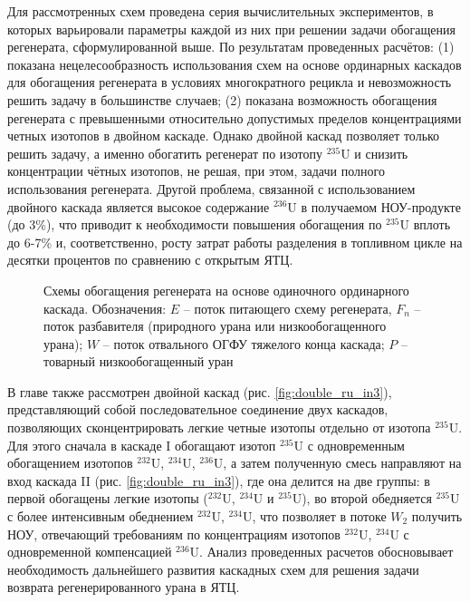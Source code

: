 Для рассмотренных схем проведена серия вычислительных экспериментов, в которых варьировали параметры каждой из них при решении задачи обогащения регенерата, сформулированной выше. По результатам проведенных расчётов: (1) показана нецелесообразность использования схем на основе ординарных каскадов для обогащения регенерата в условиях многократного рецикла и невозможность решить задачу в большинстве случаев; (2) показана возможность обогащения регенерата с превышенными относительно допустимых пределов концентрациями четных изотопов в двойном каскаде. Однако двойной каскад позволяет только решить задачу, а именно обогатить регенерат по изотопу $^{235}$U и снизить концентрации чётных изотопов, не решая, при этом, задачи полного использования регенерата. Другой проблема, связанной с использованием двойного каскада является высокое содержание $^{236}$U в получаемом НОУ-продукте (до 3\%), что приводит к необходимости повышения обогащения по $^{235}$U вплоть до 6-7\% и, соответственно, росту затрат работы разделения в топливном цикле на десятки процентов по сравнению с открытым ЯТЦ.

\begin{figure}[ht]
  \caption{Схемы обогащения регенерата на основе одиночного ординарного каскада. Обозначения: $E$ -- поток питающего схему регенерата, $F_n$ -- поток разбавителя (природного урана или низкообогащенного урана); $W$ -- поток отвального ОГФУ тяжелого конца каскада; $P$ -- товарный низкообогащенный уран}\label{fig:diagram1ch3}
\end{figure}

В главе также рассмотрен двойной каскад (рис. \ref{fig:double_ru_in3}), представляющий собой последовательное соединение двух каскадов, позволяющих сконцентрировать легкие четные изотопы отдельно от изотопа $^{235}$U. Для этого сначала в каскаде I обогащают изотоп $^{235}$U с одновременным обогащением изотопов $^{232}$U, $^{234}$U, $^{236}$U, а затем полученную смесь направляют на вход каскада II (рис. \ref{fig:double_ru_in3}), где она делится на две группы: в первой обогащены легкие изотопы ($^{232}$U, $^{234}$U и $^{235}$U), во второй обедняется $^{235}$U с более интенсивным обеднением $^{232}$U, $^{234}$U, что позволяет в потоке $W_2$ получить НОУ, отвечающий требованиям по концентрациям изотопов $^{232}$U, $^{234}$U с одновременной компенсацией $^{236}$U. Анализ проведенных расчетов обосновывает необходимость дальнейшего развития каскадных схем для решения задачи возврата регенерированного урана в ЯТЦ.


